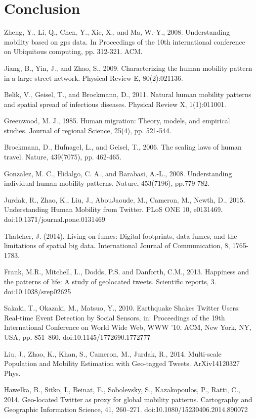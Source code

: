 \documentclass[a4paper,11pt]{article}
\begin{document}
\section*{Conclusion}

\begin{thebibliography}{10}
Zheng, Y., Li, Q., Chen, Y., Xie, X., and Ma, W.-Y., 2008. Understanding mobility based on gps data. In Proceedings of the 10th international conference on Ubiquitous computing, pp. 312-321. ACM.

Jiang, B., Yin, J., and Zhao, S., 2009. Characterizing the human mobility pattern in a large street network. Physical Review E, 80(2):021136.

Belik, V., Geisel, T., and Brockmann, D., 2011. Natural human mobility patterns and spatial spread of infectious diseases. Physical Review X, 1(1):011001.

Greenwood, M. J., 1985. Human migration: Theory, models, and empirical studies. Journal of regional Science, 25(4), pp. 521-544.

Brockmann, D., Hufnagel, L., and Geisel, T., 2006. The scaling laws of human travel. Nature, 439(7075), pp. 462-465.

Gonzalez, M. C., Hidalgo, C. A., and Barabasi, A.-L., 2008. Understanding individual human mobility patterns. Nature, 453(7196), pp.779-782.

Jurdak, R., Zhao, K., Liu, J., AbouJaoude, M., Cameron, M., Newth, D., 2015. Understanding Human Mobility from Twitter. PLoS ONE 10, e0131469. doi:10.1371/journal.pone.0131469

Thatcher, J. (2014). Living on fumes: Digital footprints, data fumes, and the limitations of spatial big data. International Journal of Communication, 8, 1765-1783.


Frank, M.R., Mitchell, L., Dodds, P.S. and Danforth, C.M., 2013. Happiness and the patterns of life: A study of geolocated tweets. Scientific reports, 3. doi:10.1038/srep02625




Sakaki, T., Okazaki, M., Matsuo, Y., 2010. Earthquake Shakes Twitter Users: Real-time Event Detection by Social Sensors, in: Proceedings of the 19th International Conference on World Wide Web, WWW ’10. ACM, New York, NY, USA, pp. 851–860. doi:10.1145/1772690.1772777

Liu, J., Zhao, K., Khan, S., Cameron, M., Jurdak, R., 2014. Multi-scale Population and Mobility Estimation with Geo-tagged Tweets. ArXiv14120327 Phys.


Hawelka, B., Sitko, I., Beinat, E., Sobolevsky, S., Kazakopoulos, P., Ratti, C., 2014. Geo-located Twitter as proxy for global mobility patterns. Cartography and Geographic Information Science, 41, 260–271. doi:10.1080/15230406.2014.890072




\end{thebibliography}
\end{document}
